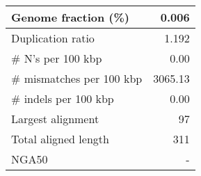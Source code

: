 \documentclass[12pt,a4paper]{article}
\begin{document}
\begin{table}[ht]
\begin{center}
\begin{tabular}{|l*{1}{|r}|}
Genome fraction (\%) & 0.006 \\ \hline
Duplication ratio & 1.192 \\ \hline
\# N's per 100 kbp & 0.00 \\ \hline
\# mismatches per 100 kbp & 3065.13 \\ \hline
\# indels per 100 kbp & 0.00 \\ \hline
Largest alignment & 97 \\ \hline
Total aligned length & 311 \\ \hline
NGA50 & - \\ \hline
\end{tabular}
\end{center}
\end{table}
\end{document}
